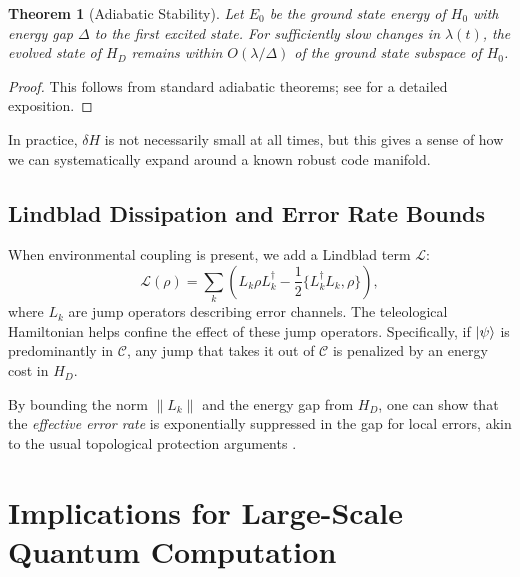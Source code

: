 \documentclass[11pt]{article}
\newtheorem{theorem}{Theorem}
\begin{document}
\begin{theorem}[Adiabatic Stability]
Let $E_0$ be the ground state energy of $H_0$ with energy gap $\Delta$ to the first excited state. For sufficiently slow changes in $\lambda(t)$, the evolved state of $H_D$ remains within $O(\lambda/\Delta)$ of the ground state subspace of $H_0$.
\end{theorem}
\begin{proof}
This follows from standard adiabatic theorems; see \cite{JansenRuskai} for a detailed exposition.
\end{proof}

In practice, $\delta H$ is not necessarily small at all times, but this gives a sense of how we can systematically expand around a known robust code manifold.

\subsection{Lindblad Dissipation and Error Rate Bounds}
When environmental coupling is present, we add a Lindblad term $\mathcal{L}$:
\begin{equation}
\mathcal{L}(\rho) = \sum_k \left( L_k \rho L_k^\dagger - \frac{1}{2}\{L_k^\dagger L_k, \rho\} \right),
\end{equation}
where $L_k$ are jump operators describing error channels. The teleological Hamiltonian helps confine the effect of these jump operators. Specifically, if $\ket{\psi}$ is predominantly in $\mathcal{C}$, any jump that takes it out of $\mathcal{C}$ is penalized by an energy cost in $H_D$.

By bounding the norm $\|L_k\|$ and the energy gap from $H_D$, one can show that the \emph{effective error rate} is exponentially suppressed in the gap for local errors, akin to the usual topological protection arguments \cite{Kitaev, Dennis2002}.

\section{Implications for Large-Scale Quantum Computation}
\end{document}
